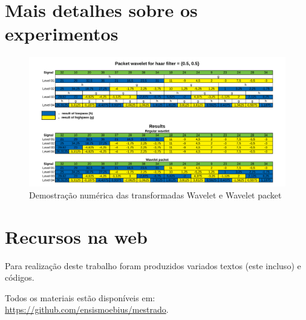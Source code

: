 \begin{apendicesenv}
	\partapendices
	\chapter{Mais detalhes sobre os experimentos}
		\begin{landscape}
			\begin{figure}[h]
				\includegraphics[width=1\linewidth]{images/haarWaveletExamples.pdf}
				\caption{Demostração numérica das transformadas Wavelet e Wavelet packet}
				\label{fig:haarWaveletExamples}
			\end{figure}
		\end{landscape}
	\chapter{Recursos na web}
		\par Para realização deste trabalho foram produzidos variados textos (este incluso) e códigos. 
		\par Todos os materiais estão disponíveis em:  \href{https://github.com/ensismoebius/mestrado}{https://github.com/ensismoebius/mestrado}.
\end{apendicesenv}